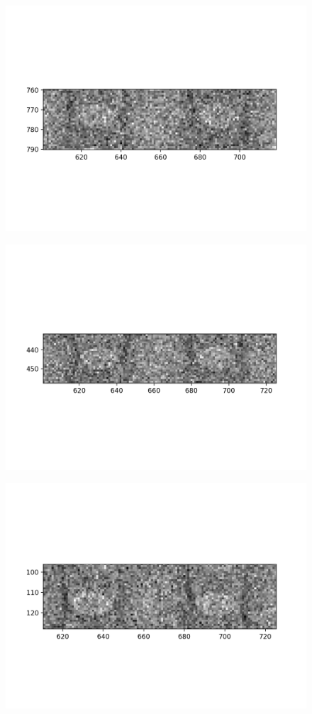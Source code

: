 \documentclass[10pt,a4paper]{article}
\begin{document}
\begin{figure}
	\includegraphics{data/image_stamps/b1}
\end{figure}
\begin{figure}
	\includegraphics{data/image_stamps/b2}
\end{figure}
\begin{figure}
	\includegraphics{data/image_stamps/b3}
\end{figure}
\end{document}
